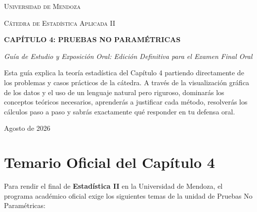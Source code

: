 \documentclass[11pt,a4paper]{article}
\begin{document}
\begin{titlepage}
    \centering
    \vspace*{1.5cm}
    {\scshape\LARGE Universidad de Mendoza \par}
    \vspace*{0.5cm}
    {\scshape\Large Cátedra de Estadística Aplicada II \par}
    \vspace*{1.5cm}
    {\Huge\bfseries CAPÍTULO 4: PRUEBAS NO PARAMÉTRICAS \par}
    \vspace*{0.8cm}
    {\Large\itshape Guía de Estudio y Exposición Oral: Edición Definitiva para el Examen Final Oral \par}
    \vspace*{1.5cm}
    \vfill
    \begin{tcolorbox}[colback=blue!5!white,colframe=blue!40!black,title=¿Cómo usar esta guía?]
        Esta guía explica la teoría estadística del Capítulo 4 partiendo directamente de los problemas y casos prácticos de la cátedra. A través de la visualización gráfica de los datos y el uso de un lenguaje natural pero riguroso, dominarás los conceptos teóricos necesarios, aprenderás a justificar cada método, resolverás los cálculos paso a paso y sabrás exactamente qué responder en tu defensa oral.
    \end{tcolorbox}
    \vfill
    {\large Agosto de 2026 \par}
\end{titlepage}
\newpage

\tableofcontents
\newpage

\section{Temario Oficial del Capítulo 4}
Para rendir el final de \textbf{Estadística II} en la Universidad de Mendoza, el programa académico oficial exige los siguientes temas de la unidad de Pruebas No Paramétricas:
\end{document}
